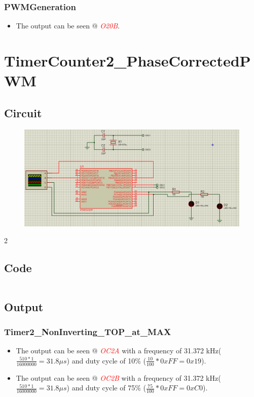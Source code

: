 \documentclass[oneside]{book}
\newcommand{\pinFormat}[1]{\emph{\textcolor{red}{#1}}}
\begin{document}
\subsubsection{PWMGeneration}
\begin{itemize}
    \item The output can be seen @ \pinFormat{O20B}.
\end{itemize}

\section{TimerCounter2\_PhaseCorrectedPWM}
\subsection{Circuit}
\begin{figure}[H]
    \centering
    \includegraphics[height=0.2\textheight]{TimerCounter2_PhaseCorrectedPWM.png}
\end{figure}2
\subsection{Code}
\inputminted[breaklines, bgcolor=black]{c}{../programFiles/TimerCounter2_PhaseCorrectedPWM.c}
\subsection{Output}
\subsubsection{Timer2\_NonInverting\_TOP\_at\_MAX}
\begin{itemize}
    \item The output can be seen @ \pinFormat{OC2A} with a frequency of 31.372 kHz($\frac{510 * 1}{16000000} = 31.8\mu s$) and duty cycle of 10\% ($\frac{10}{100} * 0xFF = 0x19$).
    \item The output can be seen @ \pinFormat{OC2B} with a frequency of 31.372 kHz($\frac{510 * 1}{16000000} = 31.8\mu s$) and duty cycle of 75\% ($\frac{75}{100} * 0xFF = 0xC0$).
\end{itemize}
\end{document}
